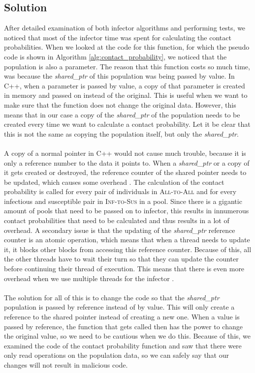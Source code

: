 \subsection{Solution}
\label{subsec:first_opt_solution}
After detailed examination of both infector algorithms and performing tests, we noticed that most of the infector time was spent for calculating the contact probabilities. When we looked at the code for this function, for which the pseudo code is shown in Algorithm \ref{alg:contact_probability}, we noticed that the population is also a parameter. The reason that this function costs so much time, was because the \textit{shared\_ptr} of this population was being passed by value. In C++, when a parameter is passed by value, a copy of that parameter is created in memory and passed on instead of the original. This is useful when we want to make sure that the function does not change the original data. However, this means that in our case a copy of the \textit{shared\_ptr} of the population needs to be created every time we want to calculate a contact probability. Let it be clear that this is not the same as copying the population itself, but only the \textit{shared\_ptr}.
\\\\
A copy of a normal pointer in C++ would not cause much trouble, because it is only a reference number to the data it points to. When a \textit{shared\_ptr} or a copy of it gets created or destroyed, the reference counter of the shared pointer needs to be updated, which causes some overhead \cite{shared_ptr_doc_microsoft}. The calculation of the contact probability is called for every pair of individuals in \textsc{All-to-All} and for every infectious and susceptible pair in \textsc{Inf-to-Sus} in a pool. Since there is a gigantic amount of pools that need to be passed on to infector, this results in innumerous contact probabilities that need to be calculated and thus results in a lot of overhead. A secondary issue is that the updating of the \textit{shared\_ptr} reference counter is an atomic operation, which means that when a thread needs to update it, it blocks other blocks from accessing this reference counter. Because of this, all the other threads have to wait their turn so that they can update the counter before continuing their thread of execution. This means that there is even more overhead when we use multiple threads for the infector \cite{shared_ptr_doc_microsoft}.
\\\\
The solution for all of this is to change the code so that the \textit{shared\_ptr} population is passed by reference instead of by value. This will only create a reference to the shared pointer instead of creating a new one. When a value is passed by reference, the function that gets called then has the power to change the original value, so we need to be cautious when we do this. Because of this, we examined the code of the contact probability function and saw that there were only read operations on the population data, so we can safely say that our changes will not result in malicious code.


